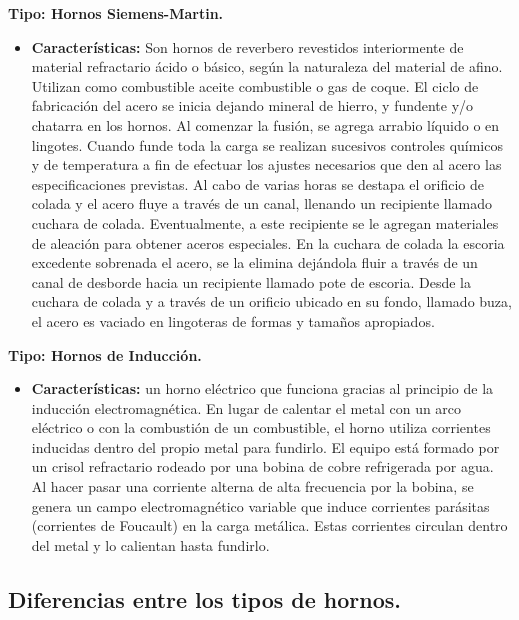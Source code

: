 \documentclass[12pt,a4paper]{article}
\begin{document}
\textbf{Tipo: Hornos Siemens-Martin.}

\begin{itemize}
    \item \textbf{Características:} 
    Son hornos de reverbero revestidos interiormente de material refractario ácido o básico, según la naturaleza del material de afino. Utilizan como combustible aceite combustible o gas de coque. El ciclo de fabricación del acero se inicia dejando mineral de hierro, y fundente y/o chatarra en los hornos. Al comenzar la fusión, se agrega arrabio líquido o en lingotes. Cuando funde toda la carga se realizan sucesivos controles químicos y de temperatura a fin de efectuar los ajustes necesarios que den al acero las especificaciones previstas. Al cabo de varias horas se destapa el orificio de colada y el acero fluye a través de un canal, llenando un recipiente llamado cuchara de colada. Eventualmente, a este recipiente se le agregan materiales de aleación para obtener aceros especiales. En la cuchara de colada la escoria excedente sobrenada el acero, se la elimina dejándola fluir a través de un canal de desborde hacia un recipiente llamado pote de escoria. 
    Desde la cuchara de colada y a través de un orificio ubicado en su fondo, llamado buza, el acero es vaciado en lingoteras de formas y tamaños apropiados.
\end{itemize}

\textbf{Tipo: Hornos de Inducción.}

\begin{itemize}
    \item \textbf{Características:} 
    un horno eléctrico que funciona gracias al principio de la inducción electromagnética. En lugar de calentar el metal con un arco eléctrico o con la combustión de un combustible, el horno utiliza corrientes inducidas dentro del propio metal para fundirlo.
    El equipo está formado por un crisol refractario rodeado por una bobina de cobre refrigerada por agua. Al hacer pasar una corriente alterna de alta frecuencia por la bobina, se genera un campo electromagnético variable que induce corrientes parásitas (corrientes de Foucault) en la carga metálica. Estas corrientes circulan dentro del metal y lo calientan hasta fundirlo.
\end{itemize}

\subsection{Diferencias entre los tipos de hornos.}
\end{document}
